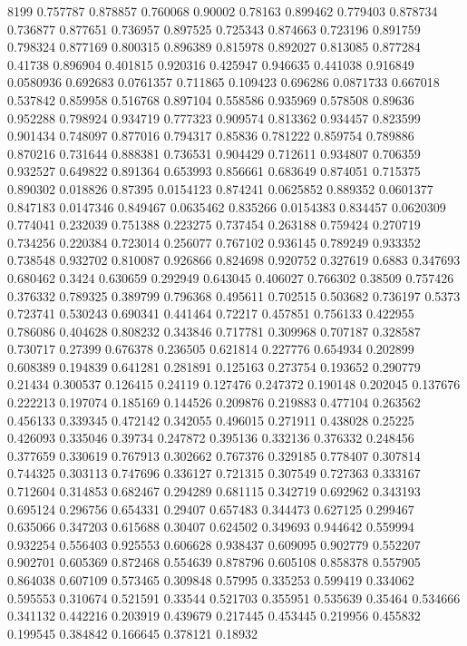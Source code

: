 8199
0.757787 0.878857
0.760068 0.90002
0.78163 0.899462
0.779403 0.878734
0.736877 0.877651
0.736957 0.897525
0.725343 0.874663
0.723196 0.891759
0.798324 0.877169
0.800315 0.896389
0.815978 0.892027
0.813085 0.877284
0.41738 0.896904
0.401815 0.920316
0.425947 0.946635
0.441038 0.916849
0.0580936 0.692683
0.0761357 0.711865
0.109423 0.696286
0.0871733 0.667018
0.537842 0.859958
0.516768 0.897104
0.558586 0.935969
0.578508 0.89636
0.952288 0.798924
0.934719 0.777323
0.909574 0.813362
0.934457 0.823599
0.901434 0.748097
0.877016 0.794317
0.85836 0.781222
0.859754 0.789886
0.870216 0.731644
0.888381 0.736531
0.904429 0.712611
0.934807 0.706359
0.932527 0.649822
0.891364 0.653993
0.856661 0.683649
0.874051 0.715375
0.890302 0.018826
0.87395 0.0154123
0.874241 0.0625852
0.889352 0.0601377
0.847183 0.0147346
0.849467 0.0635462
0.835266 0.0154383
0.834457 0.0620309
0.774041 0.232039
0.751388 0.223275
0.737454 0.263188
0.759424 0.270719
0.734256 0.220384
0.723014 0.256077
0.767102 0.936145
0.789249 0.933352
0.738548 0.932702
0.810087 0.926866
0.824698 0.920752
0.327619 0.6883
0.347693 0.680462
0.3424 0.630659
0.292949 0.643045
0.406027 0.766302
0.38509 0.757426
0.376332 0.789325
0.389799 0.796368
0.495611 0.702515
0.503682 0.736197
0.5373 0.723741
0.530243 0.690341
0.441464 0.72217
0.457851 0.756133
0.422955 0.786086
0.404628 0.808232
0.343846 0.717781
0.309968 0.707187
0.328587 0.730717
0.27399 0.676378
0.236505 0.621814
0.227776 0.654934
0.202899 0.608389
0.194839 0.641281
0.281891 0.125163
0.273754 0.193652
0.290779 0.21434
0.300537 0.126415
0.24119 0.127476
0.247372 0.190148
0.202045 0.137676
0.222213 0.197074
0.185169 0.144526
0.209876 0.219883
0.477104 0.263562
0.456133 0.339345
0.472142 0.342055
0.496015 0.271911
0.438028 0.25225
0.426093 0.335046
0.39734 0.247872
0.395136 0.332136
0.376332 0.248456
0.377659 0.330619
0.767913 0.302662
0.767376 0.329185
0.778407 0.307814
0.744325 0.303113
0.747696 0.336127
0.721315 0.307549
0.727363 0.333167
0.712604 0.314853
0.682467 0.294289
0.681115 0.342719
0.692962 0.343193
0.695124 0.296756
0.654331 0.29407
0.657483 0.344473
0.627125 0.299467
0.635066 0.347203
0.615688 0.30407
0.624502 0.349693
0.944642 0.559994
0.932254 0.556403
0.925553 0.606628
0.938437 0.609095
0.902779 0.552207
0.902701 0.605369
0.872468 0.554639
0.878796 0.605108
0.858378 0.557905
0.864038 0.607109
0.573465 0.309848
0.57995 0.335253
0.599419 0.334062
0.595553 0.310674
0.521591 0.33544
0.521703 0.355951
0.535639 0.35464
0.534666 0.341132
0.442216 0.203919
0.439679 0.217445
0.453445 0.219956
0.455832 0.199545
0.384842 0.166645
0.378121 0.18932
